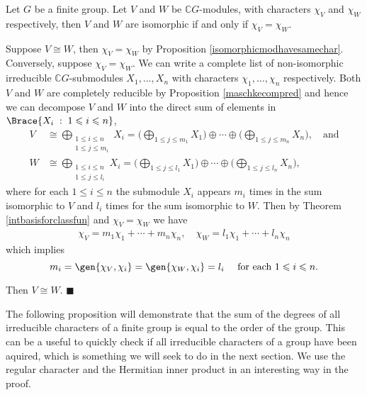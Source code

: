 \documentclass[../Project.tex]{subfiles}
\begin{document}
\begin{theo}[{\cite[Theorem 14.21]{2}}]
	Let $G$ be a finite group. Let $V$ and $W$ be $\mathbb{C}G$-modules, with characters $\chi_V$ and $\chi_W$ respectively, then $V$ and $W$ are isomorphic if and only if $\chi_V = \chi_W$.
\end{theo}
\begin{proo*}[{\cite[Theorem 14.21]{2}}]
	Suppose $V \cong W$, then $\chi_V = \chi_W$ by Proposition \ref{isomorphicmodhavesamechar}.\\

	Conversely, suppose $\chi_V = \chi_W$. We can write a complete list of non-isomorphic irreducible $\mathbb{C}G$-submodules $X_1,\dots,X_n$ with characters $\chi_1,\dots,\chi_n$ respectively. Both $V$ and $W$ are completely reducible by Proposition \ref{maschkecompred} and hence we can decompose $V$ and $W$ into the direct sum of elements in $\Brace{X_i\;:\; 1 \leqslant i \leqslant n}$,
	\begin{align*}
	V &\cong \bigoplus_{\substack{1 \leqslant i \leqslant n\\1 \leqslant j \leqslant m_i}}X_i = \Big({\bigoplus_{1 \leqslant j \leqslant m_1}X_1}\Big) \oplus \cdots \oplus \Big({\bigoplus_{1 \leqslant j \leqslant m_n}X_n}\Big), \quad \text{and}\\
	W &\cong \bigoplus_{\substack{1 \leqslant i \leqslant n\\1 \leqslant j \leqslant l_i}}X_i = \Big({\bigoplus_{1 \leqslant j \leqslant l_1}X_1}\Big) \oplus \cdots \oplus \Big({\bigoplus_{1 \leqslant j \leqslant l_n}X_n}\Big),
	\end{align*}
	where for each $1 \leqslant i \leqslant n$ the submodule $X_i$ appears $m_i$ times in the sum isomorphic to $V$  and  $l_i$ times for the sum isomorphic to $W$. Then by Theorem \ref{intbasisforclassfun} and $\chi_V = \chi_W$ we have
	\begin{align*}
		\chi_V = m_1\chi_1 + \cdots + m_n\chi_n,\quad \chi_W = l_1\chi_1 + \cdots + l_n\chi_n
	\end{align*}
	which implies
	$$m_i = \gen{\chi_V,\chi_i} = \gen{\chi_W,\chi_i} = l_i \quad \text{ for each } 1 \leqslant i \leqslant n.$$

	Then $V \cong W$. \hfill$\blacksquare$\\
\end{proo*}

The following proposition will demonstrate that the sum of the degrees of all irreducible characters of a finite group is equal to the order of the group. This can be a useful to quickly check if all irreducible characters of a group have been aquired, which is something we will seek to do in the next section. We use the regular character and the Hermitian inner product in an interesting way in the proof.
\end{document}
